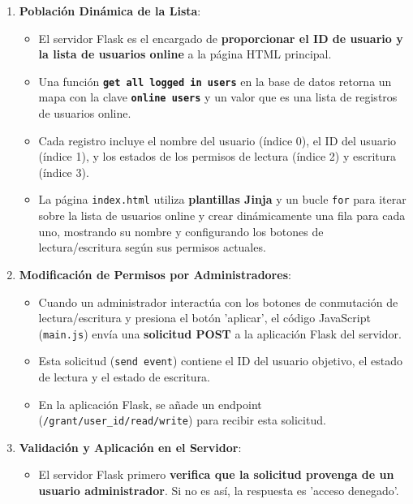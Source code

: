 \documentclass{report}
\begin{document}
\begin{itemize}
    \begin{enumerate}
        \item \textbf{Población Dinámica de la Lista}:
        \begin{itemize}
            \item El servidor Flask es el encargado de \textbf{proporcionar el ID de usuario y la lista de usuarios online} a la página HTML principal.
            \item Una función \textbf{\texttt{get all logged in users}} en la base de datos retorna un mapa con la clave \textbf{\texttt{online users}} 
            y un valor que es una lista de registros de usuarios online.
            \item Cada registro incluye el nombre del usuario (índice 0), el ID del usuario (índice 1), y los estados de los permisos de lectura 
            (índice 2) y escritura (índice 3).
            \item La página \texttt{index.html} utiliza \textbf{plantillas Jinja} y un bucle \texttt{for} para iterar sobre la lista de usuarios 
            online y crear dinámicamente una fila para cada uno, mostrando su nombre y configurando los botones de lectura/escritura según sus 
            permisos actuales.
        \end{itemize}
        \item \textbf{Modificación de Permisos por Administradores}:
        \begin{itemize}
            \item Cuando un administrador interactúa con los botones de conmutación de lectura/escritura y presiona el botón  'aplicar', el código 
            JavaScript (\texttt{main.js}) envía una \textbf{solicitud POST} a la aplicación Flask del servidor.
            \item Esta solicitud (\texttt{send event}) contiene el ID del usuario objetivo, el estado de lectura y el estado de escritura.
            \item En la aplicación Flask, se añade un endpoint (\verb|/grant/user_id/read/write|) para recibir esta solicitud.
        \end{itemize}
        \item \textbf{Validación y Aplicación en el Servidor}:
        \begin{itemize}
            \item El servidor Flask primero \textbf{verifica que la solicitud provenga de un usuario administrador}. Si no es así, la respuesta es  
            'acceso denegado'.

\end{itemize}
\end{enumerate}
\end{itemize}
\end{document}
